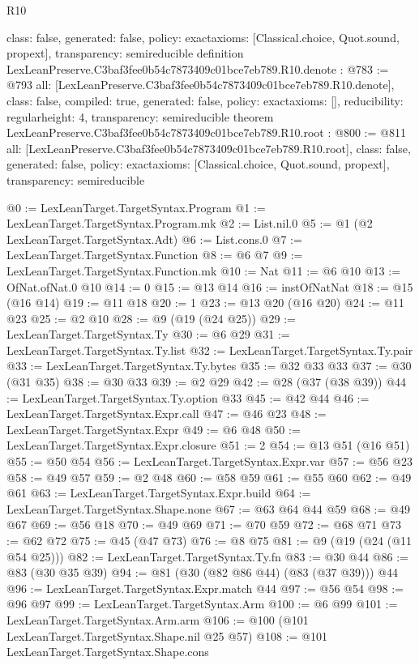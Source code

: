 \begin{lexlean}{R10}
\begin{coremodule}
{  class: false,
  generated: false,
  policy: exact{axioms: [Classical.choice, Quot.sound, propext]},
  transparency: semireducible
}
definition LexLeanPreserve.C3baf3fee0b54c7873409c01bce7eb789.R10.denote : @783 := @793 {
  all: [LexLeanPreserve.C3baf3fee0b54c7873409c01bce7eb789.R10.denote],
  class: false,
  compiled: true,
  generated: false,
  policy: exact{axioms: []},
  reducibility: regular{height: 4},
  transparency: semireducible
}
theorem LexLeanPreserve.C3baf3fee0b54c7873409c01bce7eb789.R10.root : @800 := @811 {
  all: [LexLeanPreserve.C3baf3fee0b54c7873409c01bce7eb789.R10.root],
  class: false,
  generated: false,
  policy: exact{axioms: [Classical.choice, Quot.sound, propext]},
  transparency: semireducible
}

@0 := LexLeanTarget.TargetSyntax.Program
@1 := LexLeanTarget.TargetSyntax.Program.mk
@2 := List.nil.{0}
@5 := @1 (@2 LexLeanTarget.TargetSyntax.Adt)
@6 := List.cons.{0}
@7 := LexLeanTarget.TargetSyntax.Function
@8 := @6 @7
@9 := LexLeanTarget.TargetSyntax.Function.mk
@10 := Nat
@11 := @6 @10
@13 := OfNat.ofNat.{0} @10
@14 := 0
@15 := @13 @14
@16 := instOfNatNat
@18 := @15 (@16 @14)
@19 := @11 @18
@20 := 1
@23 := @13 @20 (@16 @20)
@24 := @11 @23
@25 := @2 @10
@28 := @9 (@19 (@24 @25))
@29 := LexLeanTarget.TargetSyntax.Ty
@30 := @6 @29
@31 := LexLeanTarget.TargetSyntax.Ty.list
@32 := LexLeanTarget.TargetSyntax.Ty.pair
@33 := LexLeanTarget.TargetSyntax.Ty.bytes
@35 := @32 @33 @33
@37 := @30 (@31 @35)
@38 := @30 @33
@39 := @2 @29
@42 := @28 (@37 (@38 @39))
@44 := LexLeanTarget.TargetSyntax.Ty.option @33
@45 := @42 @44
@46 := LexLeanTarget.TargetSyntax.Expr.call
@47 := @46 @23
@48 := LexLeanTarget.TargetSyntax.Expr
@49 := @6 @48
@50 := LexLeanTarget.TargetSyntax.Expr.closure
@51 := 2
@54 := @13 @51 (@16 @51)
@55 := @50 @54
@56 := LexLeanTarget.TargetSyntax.Expr.var
@57 := @56 @23
@58 := @49 @57
@59 := @2 @48
@60 := @58 @59
@61 := @55 @60
@62 := @49 @61
@63 := LexLeanTarget.TargetSyntax.Expr.build
@64 := LexLeanTarget.TargetSyntax.Shape.none
@67 := @63 @64 @44 @59
@68 := @49 @67
@69 := @56 @18
@70 := @49 @69
@71 := @70 @59
@72 := @68 @71
@73 := @62 @72
@75 := @45 (@47 @73)
@76 := @8 @75
@81 := @9 (@19 (@24 (@11 @54 @25)))
@82 := LexLeanTarget.TargetSyntax.Ty.fn
@83 := @30 @44
@86 := @83 (@30 @35 @39)
@94 := @81 (@30 (@82 @86 @44) (@83 (@37 @39))) @44
@96 := LexLeanTarget.TargetSyntax.Expr.match @44
@97 := @56 @54
@98 := @96 @97
@99 := LexLeanTarget.TargetSyntax.Arm
@100 := @6 @99
@101 := LexLeanTarget.TargetSyntax.Arm.arm
@106 := @100 (@101 LexLeanTarget.TargetSyntax.Shape.nil @25 @57)
@108 := @101 LexLeanTarget.TargetSyntax.Shape.cons

\end{coremodule}
\end{lexlean}
